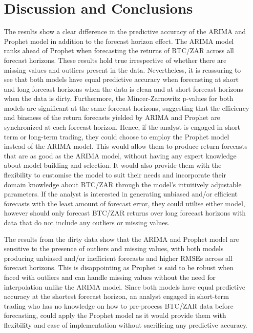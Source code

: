 \documentclass[12pt,a4paper]{article}
\numberwithin{equation}{section}
\numberwithin{figure}{section}
\numberwithin{table}{section}
\begin{document}
\section{\texorpdfstring{Discussion and Conclusions
\label{Discussion and Conclusions}}{Discussion and Conclusions }}\label{discussion-and-conclusions}

The results show a clear difference in the predictive accuracy of the
ARIMA and Prophet model in addition to the forecast horizon effect. The
ARIMA model ranks ahead of Prophet when forecasting the returns of
BTC/ZAR across all forecast horizons. These results hold true
irrespective of whether there are missing values and outliers present in
the data. Nevertheless, it is reassuring to see that both models have
equal predictive accuracy when forecasting at short and long forecast
horizons when the data is clean and at short forecast horizons when the
data is dirty. Furthermore, the Mincer-Zarnowitz p-values for both
models are significant at the same forecast horizons, suggesting that
the efficiency and biasness of the return forecasts yielded by ARIMA and
Prophet are synchronized at each forecast horizon. Hence, if the analyst
is engaged in short-term or long-term trading, they could choose to
employ the Prophet model instead of the ARIMA model. This would allow
them to produce return forecasts that are as good as the ARIMA model,
without having any expert knowledge about model building and selection.
It would also provide them with the flexibility to customise the model
to suit their needs and incorporate their domain knowledge about BTC/ZAR
through the model's intuitively adjustable parameters. If the analyst is
interested in generating unbiased and/or efficient forecasts with the
least amount of forecast error, they could utilise either model, however
should only forecast BTC/ZAR returns over long forecast horizons with
data that do not include any outliers or missing values.

The results from the dirty data show that the ARIMA and Prophet model
are sensitive to the presence of outliers and missing values, with both
models producing unbiased and/or inefficient forecasts and higher RMSEs
across all forecast horizons. This is disappointing as Prophet is said
to be robust when faced with outliers and can handle missing values
without the need for interpolation unlike the ARIMA model. Since both
models have equal predictive accuracy at the shortest forecast horizon,
an analyst engaged in short-term trading who has no knowledge on how to
pre-process BTC/ZAR data before forecasting, could apply the Prophet
model as it would provide them with flexibility and ease of
implementation without sacrificing any predictive accuracy.
\end{document}
